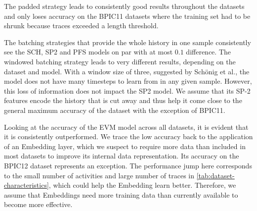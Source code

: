 The padded strategy leads to consistently good results throughout the datasets and only loses accuracy on the BPIC11 datasets where the training set had to be shrunk because traces exceeded a length threshold.

The batching strategies that provide the whole history in one sample consistently see the SCH, SP2 and PFS models on par with at most $0.1$ difference. The windowed batching strategy leads to very different results, depending on the dataset and model. With a window size of three, suggested by Schönig et al., the model does not have many timesteps to learn from in any given sample. However, this loss of information does not impact the SP2 model. We assume that its SP-2 features encode the history that is cut away and thus help it come close to the general maximum accuracy of the dataset with the exception of BPIC11.

Looking at the accuracy of the EVM model across all datasets, it is evident that it is consistently outperformed. We trace the low accuracy back to the application of an Embedding layer, which we suspect to require more data than included in most datasets to improve its internal data representation.
Its accuracy on the BPIC12 dataset represents an exception. The performance jump here corresponds to the small number of activities and large number of traces in \autoref{tab:dataset-characteristics}, which could help the Embedding learn better. Therefore, we assume that Embeddings need more training data than currently available to become more effective.

